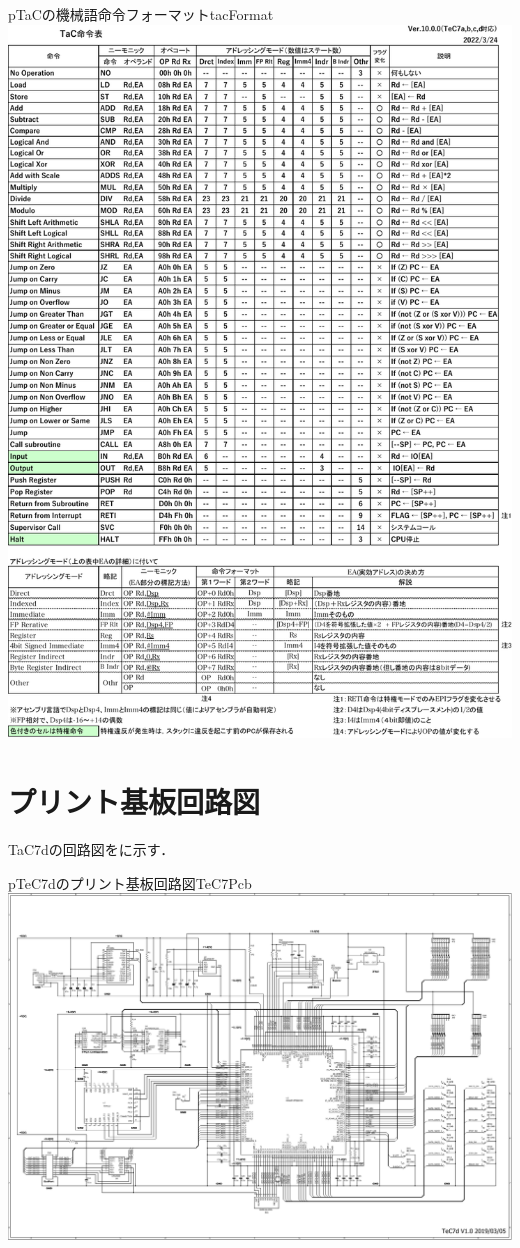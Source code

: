 \begin{myfig}{p}{TaCの機械語命令フォーマット}{tacFormat}
  \includegraphics[scale=0.86,page=3]{Fig/TacInst-crop.pdf}
\end{myfig}

\section{プリント基板回路図}
TaC7dの回路図をに示す．

\begin{myfig}{p}{TeC7dのプリント基板回路図}{TeC7Pcb}
  \includegraphics[angle=90,scale=0.85]{Fig/TeC7dPcb.pdf}
\end{myfig}
